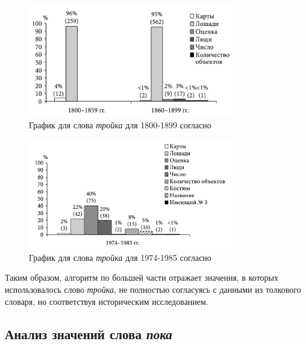 \documentclass[LI,VKR]{HSEUniversity}
\begin{document}
\noindent %
\begin{figure}[H]
    \centering %
    \includegraphics[width=0.8\textwidth]{img/book/trojka/1800-1899}
    \caption{График для слова \textit{тройка} для 1800-1899 согласно~\cite{TwoCenturies}}
    \label{fig:TwoCenturiesTrojka1}
\end{figure}

\begin{figure}[H]
    \centering %
    \includegraphics[width=0.8\textwidth]{img/book/trojka/1974-1985}
    \caption{График для слова \textit{тройка} для 1974-1985 согласно~\cite{TwoCenturies}}
    \label{fig:TwoCenturiesTrojka2}
\end{figure}

Таким образом, алгоритм по большей части отражает значения, в которых использовалось
слово \textit{тройка}, не полностью согласуясь с данными из толкового словаря,
но соответствуя историческим исследованием.

\subsection*{Анализ значений слова \textit{пока}}
\end{document}
